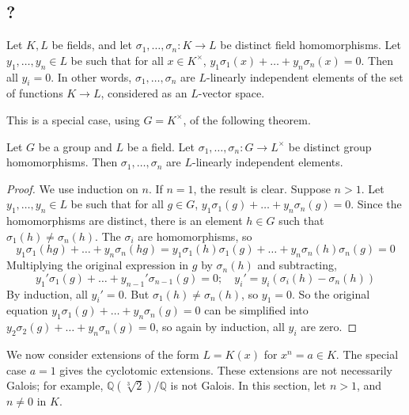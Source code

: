 \subsection{?}
\begin{theorem}
	Let \( K, L \) be fields, and let \( \sigma_1, \dots, \sigma_n \colon K \to L \) be distinct field homomorphisms.
	Let \( y_1, \dots, y_n \in L \) be such that for all \( x \in K^\times \), \( y_1 \sigma_1(x) + \dots + y_n \sigma_n(x) = 0 \).
	Then all \( y_i = 0 \).
	In other words, \( \sigma_1, \dots, \sigma_n \) are \( L \)-linearly independent elements of the set of functions \( K \to L \), considered as an \( L \)-vector space.
\end{theorem}
This is a special case, using \( G = K^\times \), of the following theorem.
\begin{theorem}
	Let \( G \) be a group and \( L \) be a field.
	Let \( \sigma_1, \dots, \sigma_n \colon G \to L^\times \) be distinct group homomorphisms.
	Then \( \sigma_1, \dots, \sigma_n \) are \( L \)-linearly independent elements.
\end{theorem}
\begin{proof}
	We use induction on \( n \).
	If \( n = 1 \), the result is clear.
	Suppose \( n > 1 \).
	Let \( y_1, \dots, y_n \in L \) be such that for all \( g \in G \), \( y_1 \sigma_1(g) + \dots + y_n \sigma_n(g) = 0 \).
	Since the homomorphisms are distinct, there is an element \( h \in G \) such that \( \sigma_1(h) \neq \sigma_n(h) \).
	The \( \sigma_i \) are homomorphisms, so
	\[ y_1 \sigma_1(hg) + \dots + y_n \sigma_n(hg) = y_1 \sigma_1(h)\sigma_1(g) + \dots + y_n \sigma_n(h)\sigma_n(g) = 0 \]
	Multiplying the original expression in \( g \) by \( \sigma_n(h) \) and subtracting,
	\[ y_1' \sigma_1(g) + \dots + y_{n-1}'\sigma_{n-1}(g) = 0;\quad y_i' = y_i(\sigma_i(h) - \sigma_n(h)) \]
	By induction, all \( y_i' = 0 \).
	But \( \sigma_1(h) \neq \sigma_n(h) \), so \( y_1 = 0 \).
	So the original equation \( y_1\sigma_1(g) + \dots + y_n\sigma_n(g) = 0 \) can be simplified into \( y_2\sigma_2(g) + \dots + y_n\sigma_n(g) = 0 \), so again by induction, all \( y_i \) are zero.
\end{proof}
We now consider extensions of the form \( L = K(x) \) for \( x^n = a \in K \).
The special case \( a = 1 \) gives the cyclotomic extensions.
These extensions are not necessarily Galois; for example, \( \mathbb Q(\sqrt[3]{2}) / \mathbb Q \) is not Galois.
In this section, let \( n > 1 \), and \( n \neq 0 \) in \( K \).
